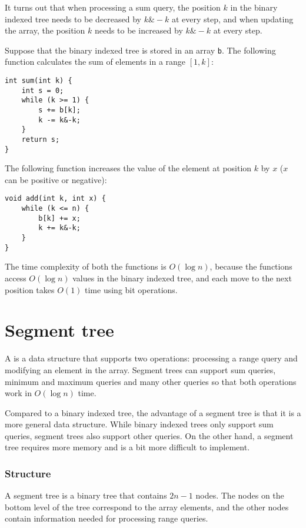 It turns out that when processing a sum query,
the position $k$ in the binary indexed tree needs to be
decreased by $k \& -k$ at every step,
and when updating the array,
the position $k$ needs to be increased by $k \& -k$ at every step.

Suppose that the binary indexed tree is stored in an array \texttt{b}.
The following function calculates
the sum of elements in a range $[1,k]$:
\begin{lstlisting}
int sum(int k) {
    int s = 0;
    while (k >= 1) {
        s += b[k];
        k -= k&-k;
    }
    return s;
}
\end{lstlisting}

The following function increases the value
of the element at position $k$ by $x$
($x$ can be positive or negative):
\begin{lstlisting}
void add(int k, int x) {
    while (k <= n) {
        b[k] += x;
        k += k&-k;
    }
}
\end{lstlisting}

The time complexity of both the functions is
$O(\log n)$, because the functions access $O(\log n)$
values in the binary indexed tree, and each move
to the next position
takes $O(1)$ time using bit operations.

\section{Segment tree}


A  is a data structure
that supports two operations:
processing a range query and
modifying an element in the array.
Segment trees can support
sum queries, minimum and maximum queries and many other
queries so that both operations work in $O(\log n)$ time.

Compared to a binary indexed tree,
the advantage of a segment tree is that it is
a more general data structure.
While binary indexed trees only support
sum queries, segment trees also support other queries.
On the other hand, a segment tree requires more
memory and is a bit more difficult to implement.

\subsubsection{Structure}

A segment tree is a binary tree that
contains $2n-1$ nodes.
The nodes on the bottom level of the tree
correspond to the array elements,
and the other nodes
contain information needed for processing range queries.

